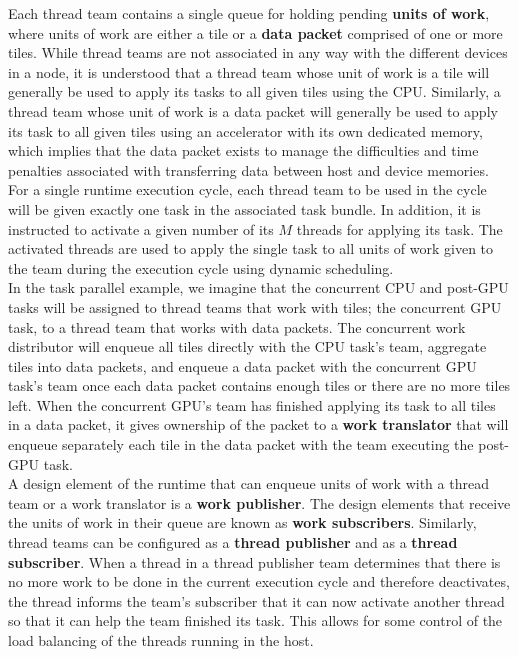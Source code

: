 \documentclass{article}
\begin{document}
Each thread team contains a single queue for holding pending \textbf{units of
work}, where units of work are either a tile or a \textbf{data packet} comprised
of one or more tiles.  While thread teams are not associated in any way with the
different devices in a node, it is understood that a thread team whose unit of
work is a tile will generally be used to apply its tasks to all given tiles
using the CPU.  Similarly, a thread team whose unit of work is a data packet
will generally be used to apply its task to all given tiles using an
accelerator with its own dedicated memory, which implies that the data packet
exists to manage the difficulties and time penalties associated with
transferring data between host and device memories.\\

For a single runtime execution cycle, each thread team to be used in the cycle
will be given exactly one task in the associated task bundle.  In addition, it
is instructed to activate a given number of its $M$ threads for applying its
task.  The activated threads are used to apply the single task to all units of
work given to the team during the execution cycle using dynamic scheduling.\\

In the task parallel example, we imagine that the concurrent CPU and post-GPU
tasks will be assigned to thread teams that work with tiles; the concurrent GPU
task, to a thread team that works with data packets.  The concurrent work
distributor will enqueue all tiles directly with the CPU task's team, aggregate
tiles into data packets, and enqueue a data packet with the concurrent GPU
task's team once each data packet contains enough tiles or there are no more
tiles left.  When the concurrent GPU's team has finished applying its task to
all tiles in a data packet, it gives ownership of the packet to a \textbf{work
translator} that will enqueue separately each tile in the data packet with the
team executing the post-GPU task.\\

A design element of the runtime that can enqueue units of work with a thread
team or a work translator is a \textbf{work publisher}.  The design elements
that receive the units of work in their queue are known as \textbf{work
subscribers}.  Similarly, thread teams can be configured as a \textbf{thread
publisher} and as a \textbf{thread subscriber}.  When a thread in a thread
publisher team determines that there is no more work to be done in the current
execution cycle and therefore deactivates, the thread informs the team's
subscriber that it can now activate another thread so that it can help the team
finished its task.  This allows for some control of the load balancing of the
threads running in the host.\\
\end{document}
